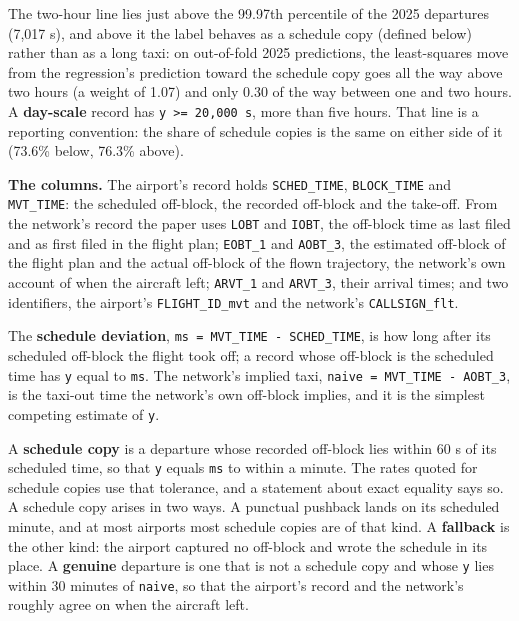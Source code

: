 \documentclass[
  manuscript=article,
  layout=preprint,
  year=2026,
  volume=x,
]{extra/joas}
\begin{document}
The two-hour line lies just above the 99.97th percentile of the 2025 departures (7,017 s), and above it the label behaves as a schedule copy (defined below) rather than as a long taxi: on out-of-fold 2025 predictions, the least-squares move from the regression's prediction toward the schedule copy goes all the way above two hours (a weight of 1.07) and only 0.30 of the way between one and two hours. A \textbf{day-scale} record has \texttt{y\ \textgreater{}=\ 20,000\ s}, more than five hours. That line is a reporting convention: the share of schedule copies is the same on either side of it (73.6\% below, 76.3\% above).

\textbf{The columns.} The airport's record holds \texttt{SCHED\_TIME}, \texttt{BLOCK\_TIME} and \texttt{MVT\_TIME}: the scheduled off-block, the recorded off-block and the take-off. From the network's record the paper uses \texttt{LOBT} and \texttt{IOBT}, the off-block time as last filed and as first filed in the flight plan; \texttt{EOBT\_1} and \texttt{AOBT\_3}, the estimated off-block of the flight plan and the actual off-block of the flown trajectory, the network's own account of when the aircraft left; \texttt{ARVT\_1} and \texttt{ARVT\_3}, their arrival times; and two identifiers, the airport's \texttt{FLIGHT\_ID\_mvt} and the network's \texttt{CALLSIGN\_flt}.

The \textbf{schedule deviation}, \texttt{ms\ =\ MVT\_TIME\ -\ SCHED\_TIME}, is how long after its scheduled off-block the flight took off; a record whose off-block is the scheduled time has \texttt{y} equal to \texttt{ms}. The network's implied taxi, \texttt{naive\ =\ MVT\_TIME\ -\ AOBT\_3}, is the taxi-out time the network's own off-block implies, and it is the simplest competing estimate of \texttt{y}.

A \textbf{schedule copy} is a departure whose recorded off-block lies within 60 s of its scheduled time, so that \texttt{y} equals \texttt{ms} to within a minute. The rates quoted for schedule copies use that tolerance, and a statement about exact equality says so. A schedule copy arises in two ways. A punctual pushback lands on its scheduled minute, and at most airports most schedule copies are of that kind. A \textbf{fallback} is the other kind: the airport captured no off-block and wrote the schedule in its place. A \textbf{genuine} departure is one that is not a schedule copy and whose \texttt{y} lies within 30 minutes of \texttt{naive}, so that the airport's record and the network's roughly agree on when the aircraft left.
\end{document}

